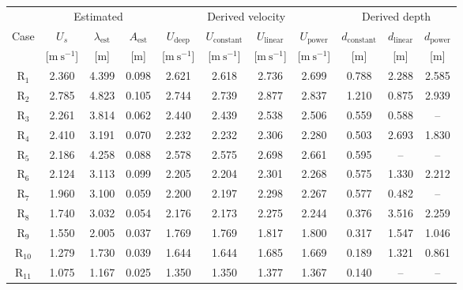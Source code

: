\begin{table}[htbp]
\centering
\begin{tabular}{c c c c c c c c c c c}
\toprule
& \multicolumn{3}{c}{Estimated}
& \multicolumn{4}{c}{Derived velocity}
& \multicolumn{3}{c}{Derived depth} \\
\cmidrule(lr){2-4}
\cmidrule(lr){5-8}
\cmidrule(lr){9-11}
Case
& $U_s$
& $\lambda_{\mathrm{est}}$
& $A_{\mathrm{est}}$
& $U_{\mathrm{deep}}$
& $U_{\mathrm{constant}}$
& $U_{\mathrm{linear}}$
& $U_{\mathrm{power}}$
& $d_{\mathrm{constant}}$
& $d_{\mathrm{linear}}$
& $d_{\mathrm{power}}$ \\
& {[\(\mathrm{m~s^{-1}}\)]}
& {[\(\mathrm{m}\)]}
& {[\(\mathrm{m}\)]}
& {[\(\mathrm{m~s^{-1}}\)]}
& {[\(\mathrm{m~s^{-1}}\)]}
& {[\(\mathrm{m~s^{-1}}\)]}
& {[\(\mathrm{m~s^{-1}}\)]}
& {[\(\mathrm{m}\)]}
& {[\(\mathrm{m}\)]}
& {[\(\mathrm{m}\)]} \\
\midrule
R$_{1}$ & 2.360 & 4.399 & 0.098 & 2.621 & 2.618 & 2.736 & 2.699 & 0.788 & 2.288 & 2.585 \\
R$_{2}$ & 2.785 & 4.823 & 0.105 & 2.744 & 2.739 & 2.877 & 2.837 & 1.210 & 0.875 & 2.939 \\
R$_{3}$ & 2.261 & 3.814 & 0.062 & 2.440 & 2.439 & 2.538 & 2.506 & 0.559 & 0.588 & -- \\
R$_{4}$ & 2.410 & 3.191 & 0.070 & 2.232 & 2.232 & 2.306 & 2.280 & 0.503 & 2.693 & 1.830 \\
R$_{5}$ & 2.186 & 4.258 & 0.088 & 2.578 & 2.575 & 2.698 & 2.661 & 0.595 & -- & -- \\
R$_{6}$ & 2.124 & 3.113 & 0.099 & 2.205 & 2.204 & 2.301 & 2.268 & 0.575 & 1.330 & 2.212 \\
R$_{7}$ & 1.960 & 3.100 & 0.059 & 2.200 & 2.197 & 2.298 & 2.267 & 0.577 & 0.482 & -- \\
R$_{8}$ & 1.740 & 3.032 & 0.054 & 2.176 & 2.173 & 2.275 & 2.244 & 0.376 & 3.516 & 2.259 \\
R$_{9}$ & 1.550 & 2.005 & 0.037 & 1.769 & 1.769 & 1.817 & 1.800 & 0.317 & 1.547 & 1.046 \\
R$_{10}$ & 1.279 & 1.730 & 0.039 & 1.644 & 1.644 & 1.685 & 1.669 & 0.189 & 1.321 & 0.861 \\
R$_{11}$ & 1.075 & 1.167 & 0.025 & 1.350 & 1.350 & 1.377 & 1.367 & 0.140 & -- & -- \\
\bottomrule
\end{tabular}
\bigskip

\end{table}
